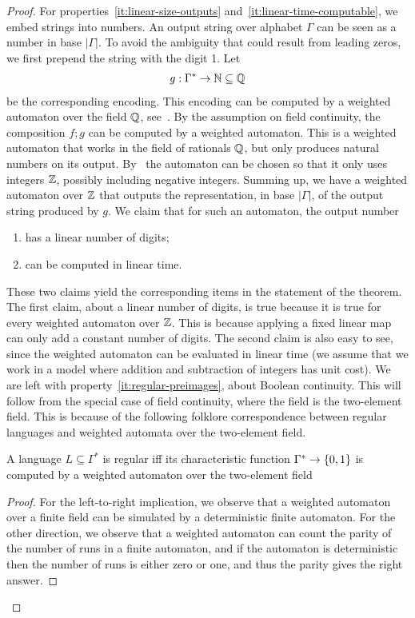 \begin{proof}
    For properties~\ref{it:linear-size-outputs} and~\ref{it:linear-time-computable}, we embed strings into numbers. 
    An output string over alphabet $\Gamma$ can be seen as a number in base $|\Gamma|$. To avoid the ambiguity that could result from leading zeros, we first prepend the string with the digit 1. Let 
    \begin{align*}
    g : \Gamma^* \to {\mathbb N} \subseteq {\mathbb Q}
    \end{align*} 
    be the corresponding encoding. This encoding can be computed by a weighted automaton over the field ${\mathbb Q}$, see~\cite[Lemma 8.10]{bojanczyk_automata_2025}. By  the assumption on field continuity, the composition $f;g$ can be computed by a weighted automaton. This is a weighted automaton that works in the field of rationals ${\mathbb Q}$, but  only produces natural numbers on its output. By~\cite[p. 110]{BerstelReutenauer08}  the automaton can be chosen so that it only uses  integers ${\mathbb Z}$, possibly including negative integers. Summing up, we have a weighted automaton over ${\mathbb Z}$ that outputs the representation, in base $|\Gamma|$, of the output string produced by $g$. We claim that for such an automaton, the output number
    \begin{enumerate}
        \item has a linear number of digits;
        \item can be computed in linear time.
    \end{enumerate}
    These two claims yield the corresponding items in the statement of the theorem. The first claim, about a linear number of digits, is true because it is true for every weighted automaton over ${\mathbb Z}$. This is because applying a fixed linear map can only add a constant number of digits. The second claim is also easy to see, since the weighted automaton can be evaluated in linear time (we assume that we work in a model where addition and subtraction of integers has unit cost). 
    We are left with property~\ref{it:regular-preimages}, about Boolean continuity.  This will follow from the special case of field continuity, where the field is  the two-element field.  This is because of  the following  folklore correspondence between regular languages and weighted automata over the two-element field. 
        
        \begin{claim}\label{claim:regular-weighted-automata}
            A language $L \subseteq \Gamma^*$ is regular iff its characteristic function $\Gamma^* \to \{0,1\}$ is computed by a weighted automaton over the two-element field 
        \end{claim}
        \begin{proof}
            For the left-to-right implication, we observe that a weighted automaton over a finite field can be simulated by a deterministic finite automaton. For the other direction, we observe that a weighted automaton can count the parity of  the number of runs in a finite automaton, and if the automaton is deterministic then the number of runs is either zero or one, and thus the parity gives the right answer.
        \end{proof}


\end{proof}

